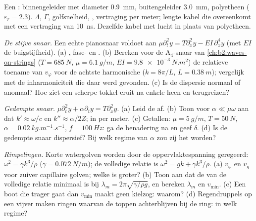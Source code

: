 \begin{exercise}[$\star$]\label{exo:b2:dispersion-wave-packets:4}
Een : binnengeleider met diameter \qty{0.9}{mm}, buitengeleider
\qty{3.0}{mm}, polyetheen ($\varepsilon_r = 2.3$). $\Lambda$, $\Gamma$,
golfsnelheid, , vertraging per meter; lengte kabel
die overeenkomt met een vertraging van \qty{10}{ns}. Dezelfde kabel met
lucht in plaats van polyetheen.
\end{exercise}

\begin{exercise}[$\star\star$]\label{exo:b2:dispersion-wave-packets:5}
\emph{De stijve snaar.} Een echte pianosnaar voldoet aan
$\mu\partial_t^2y = T\partial_x^2y
- EI\,\partial_x^4y$ (met $EI$ de
buigstijfheid). (a) , fase- en . (b) Bereken
voor de A$_4$-snaar van \cref{ch:b2:waves-on-strings} ($T = \qty{685}{N}$,
$\mu = \qty{6.1}{g/m}$, $EI =
\qty{9.8e-3}{N.m^2}$) de relatieve toename van
$v_\varphi$ voor de achtste harmonische ($k = 8\pi/L$, $L = \qty{0.38}{m}$);
vergelijk met de inharmoniciteit die daar werd gevonden. (c) Is de dispersie
normaal of anomaal? Hoe ziet een scherpe tokkel eruit na enkele
heen-en-terugreizen?
\end{exercise}

\begin{exercise}[$\star\star$]\label{exo:b2:dispersion-wave-packets:6}
\emph{Gedempte snaar.}
$\mu\partial_t^2y + \alpha\partial_ty = T\partial_x^2y$. (a) Leid de
 af. (b) Toon voor $\alpha \ll \mu\omega$ aan dat
$k' \approx \omega/c$ en $k'' \approx \alpha/2Z$;  in  per
meter. (c) Getallen: $\mu =
\qty{5}{g/m}$, $T = \qty{50}{N}$,
$\alpha = \qty{0.02}{kg.m^{-1}.s^{-1}}$, $f =
\qty{100}{Hz}$: ga de
benadering na en geef $\delta$. (d) Is de gedempte snaar dispersief? Bij
welk regime van $\alpha$ zou zij het worden?
\end{exercise}

\begin{exercise}[$\star\star$]\label{exo:b2:dispersion-wave-packets:7}
\emph{Rimpelingen.} Korte watergolven worden door de oppervlaktespanning
geregeerd: $\omega^2 =
\gamma k^3/\rho$ ($\gamma = \qty{0.072}{N/m}$); de
volledige relatie is $\omega^2 = gk +
\gamma k^3/\rho$. (a) $v_\varphi$ en
$v_g$ voor zuiver capillaire golven; welke is groter? (b) Toon aan dat de
 van de volledige relatie minimaal is bij
$\lambda_m = 2\pi\sqrt{\gamma/\rho g}$, en bereken $\lambda_m$ en
$v_{\min}$. (c) Een boot die trager gaat dan $v_{\min}$ maakt geen kielzog:
waarom? (d) Regendruppels op een vijver maken ringen waarvan de toppen
achterblijven bij de ring: in welk regime?
\end{exercise}

